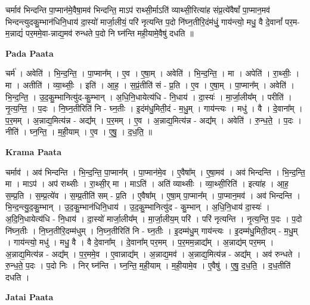 \documentclass[17pt]{extarticle}
\begin{document}
चर्माव॑ भिन्दन्ति पा॒प्मान॑मे॒वैषा॒मव॑ भिन्दन्ति॒ माऽप॑ राथ्सी॒र्माऽति॑ व्याथ्सी॒रित्या॑ह संप्र॒त्ये॑वैषां᳚ पा॒प्मान॒मव॑ भिन्दन्त्युदकु॒म्भान॑धिनि॒धाय॑ दा॒स्यो॑ मार्जा॒लीयं॒ परि॑ नृत्यन्ति प॒दो नि॑घ्न॒तीरि॒दंम॑धुं॒ गाय॑न्त्यो॒ मधु॒ वै दे॒वानां᳚ पर॒म-म॒न्नाद्यं॑ पर॒ममे॒वा-न्नाद्य॒मव॑ रुन्धते प॒दो नि घ्न॑न्ति मही॒यामे॒वैषु॑ दधति ॥ \newline

\textbf{Pada Paata} \newline

चर्म॑ । अवेति॑ । भि॒न्द॒न्ति॒ । पा॒प्मान᳚म् । ए॒व । ए॒षा॒म् । अवेति॑ । भि॒न्द॒न्ति॒ । मा । अपेति॑ । रा॒थ्सीः॒ । मा । अतीति॑ । व्या॒थ्सीः॒ । इति॑ । आ॒ह॒ । स॒प्रं॒तीति॑ सं - प्र॒ति । ए॒व । ए॒षा॒म् । पा॒प्मान᳚म् । अवेति॑ । भि॒न्द॒न्ति॒ । उ॒द॒कु॒म्भानित्यु॑द-कु॒म्भान् । अ॒धि॒नि॒धायेत्य॑धि - नि॒धाय॑ । दा॒स्यः॑ । मा॒र्जा॒लीय᳚म् । परीति॑ । नृ॒त्य॒न्ति॒ । प॒दः । नि॒घ्न॒तीरिति॑ नि - घ्न॒तीः । इ॒दंम॑धु॒मिती॒दं - म॒धु॒म् । गाय॑न्त्यः । मधु॑ । वै । दे॒वाना᳚म् । प॒र॒मम् । अ॒न्नाद्य॒मित्य॑न्न - अद्य᳚म् । प॒र॒मम् । ए॒व । अ॒न्नाद्य॒मित्य॑न्न - अद्य᳚म् । अवेति॑ । रु॒न्ध॒ते॒ । प॒दः । नीति॑ । घ्न॒न्ति॒ । म॒ही॒याम् । ए॒व । ए॒षु॒ । द॒ध॒ति॒ ॥  \newline


\textbf{Krama Paata} \newline

चर्माव॑ । अव॑ भिन्दन्ति । भि॒न्द॒न्ति॒ पा॒प्मान᳚म् । पा॒प्मान॑मे॒व । ए॒वैषा᳚म् । ए॒षा॒मव॑ । अव॑ भिन्दन्ति । भि॒न्द॒न्ति॒ मा । माऽप॑ । अप॑ राथ्सीः । रा॒थ्सी॒र् मा । माऽति॑ । अति॑ व्याथ्सीः । व्या॒थ्सी॒रिति॑ । इत्या॑ह । आ॒ह॒ स॒म्प्र॒ति । स॒म्प्र॒त्ये॑व । स॒म्प्र॒तीति॑ सम् - प्र॒ति । ए॒वैषा᳚म् । ए॒षा॒म् पा॒प्मान᳚म् । पा॒प्मान॒मव॑ । अव॑ भिन्दन्ति । भि॒न्द॒न्त्यु॒द॒कु॒म्भान् । उ॒द॒कु॒म्भान॑धिनि॒धाय॑ । उ॒द॒कु॒म्भानित्यु॑द - कु॒म्भान् । अ॒धि॒नि॒धाय॑ दा॒स्यः॑ । अ॒दि॒नि॒धायेत्य॑धि - नि॒धाय॑ । दा॒स्यो॑ मार्जा॒लीय᳚म् । मा॒र्जा॒लीय॒म् परि॑ । परि॑ नृत्यन्ति । नृ॒त्य॒न्ति॒ प॒दः । प॒दो नि॑घ्न॒तीः । नि॒घ्न॒तीरि॒दम्म॑धुम् । नि॒घ्न॒तीरिति॑ नि - घ्न॒तीः । इ॒दम्म॑धु॒म् गाय॑न्त्यः । इ॒दम्म॑धु॒मिती॒दम् - म॒धु॒म् । गाय॑न्त्यो॒ मधु॑ । मधु॒ वै । वै दे॒वाना᳚म् । दे॒वाना᳚म् पर॒मम् । प॒र॒मम॒न्नाद्य᳚म् । अ॒न्नाद्य॑म् पर॒मम् । अ॒न्नाद्य॒मित्य॑न्न - अद्य᳚म् । प॒र॒ममे॒व । ए॒वान्नाद्य᳚म् । अ॒न्नाद्य॒मव॑ । अ॒न्नाद्य॒मित्य॑न्न - अद्य᳚म् । अव॑ रुन्धते । रु॒न्ध॒ते॒ प॒दः । प॒दो निः । निर् घ्न॑न्ति । घ्न॒न्ति॒ म॒ही॒याम् । म॒ही॒यामे॒व । ए॒वैषु॑ । ए॒षु॒ द॒ध॒ति॒ । द॒ध॒तीति॑ दधति । \newline

\textbf{Jatai Paata} \newline
\end{document}
